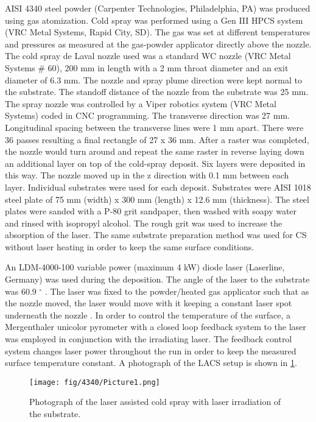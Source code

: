 AISI 4340 steel powder (Carpenter Technologies, Philadelphia, PA) was produced using gas atomization. Cold spray was performed using a Gen III HPCS system (VRC Metal Systems, Rapid City, SD). The gas was set at different temperatures and pressures as measured at the gas-powder applicator directly above the nozzle. The cold spray de Laval nozzle used was a standard WC nozzle (VRC Metal Systems $\#$ 60), 200 mm in length with a 2 mm throat diameter and an exit diameter of 6.3 mm. The nozzle and spray plume direction were kept normal to the substrate. The standoff distance of the nozzle from the substrate was 25 mm. The spray nozzle was controlled by a Viper robotics system (VRC Metal Systems) coded in CNC programming. The transverse direction was 27 mm. Longitudinal spacing between the transverse lines were 1 mm apart. There were 36 passes resulting a final rectangle of 27 x 36 mm. After a raster was completed, the nozzle would turn around and repeat the same raster in reverse laying down an additional layer on top of the cold-spray deposit. Six layers were deposited in this way. The nozzle moved up in the z direction with 0.1 mm between each layer. Individual substrates were used for each deposit. Substrates were AISI 1018 steel plate of 75 mm (width) x 300 mm (length) x 12.6 mm (thickness). The steel plates were sanded with a P-80 grit sandpaper, then washed with soapy water and rinsed with isopropyl alcohol. The rough grit was used to increase the absorption of the laser. The same substrate preparation method was used for CS without laser heating in order to keep the same surface conditions. 


An LDM-4000-100 variable power (maximum 4 kW) diode laser (Laserline, Germany) was used during the deposition. The angle of the laser to the substrate was 60.9 $ ^{\circ} $ . The laser was fixed to the powder/heated gas applicator such that as the nozzle moved, the laser would move with it keeping a constant laser spot underneath the nozzle \cite{RN511}. In order to control the temperature of the surface, a Mergenthaler unicolor pyrometer with a closed loop feedback system to the laser was employed in conjunction with the irradiating laser. The feedback control system changes laser power throughout the run in order to keep the measured surface temperature constant. A photograph of the LACS setup is shown in \ref{fig:43401}.


\begin{figure}
	\centering
	\texttt{[image: fig/4340/Picture1.png]}
	\caption{Photograph of the laser assisted cold spray with laser irradiation of the substrate.}
	\label{fig:43401}
\end{figure}


